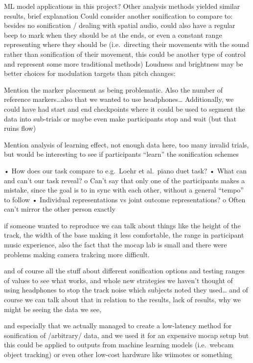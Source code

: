 \documentclass[10pt,a4paper,onecolumn]{article}
\begin{document}
ML model applications in this project?
Other analysis methods yielded similar results, brief explanation
Could consider another sonification to compare to: besides no sonification / dealing with spatial audio, could also have a regular beep to mark when they should be at the ends, or even a constant range representing where they should be (i.e.~directing their movements with the sound rather than sonification of their movement, this could be another type of control and represent some more traditional methods)
Loudness and brightness may be better choices for modulation targets than pitch changes: \autocite{mcdermottMusicalIntervalsRelative2010}

Mention the marker placement as being problematic. Also the number of reference markers\ldots also that we wanted to use headphones\ldots{}
Additionally, we could have had start and end checkpoints where it could be used to segment the data into sub-trials or maybe even make participants stop and wait (but that ruins flow)

Mention analysis of learning effect, not enough data here, too many invalid trials, but would be interesting to see if participants ``learn'' the sonification schemes

• How does our task compare to e.g.~Loehr et al.~piano duet task?
• What can and can't our task reveal?
o Can't say that only one of the participants makes a mistake, since the goal is to in sync with each other, without a general ``tempo'' to follow
• Individual representations vs joint outcome representations?
o Often can't mirror the other person exactly

if someone wanted to reproduce we can talk about things like the height of the track, the width of the base making it less comfortable, the range in participant music experience, also the fact that the mocap lab is small and there were problems making camera trakcing more difficult.

and of course all the stuff about different sonification options and testing ranges of values to see what works, and whole new strategies we haven't thought of using headphones to stop the track noise which subjects noted they used\ldots{}
and of course we can talk about that in relation to the results, lack of results, why we might be seeing the data we see,

and especially that we actually managed to create a low-latency method for sonification of /arbitrary/ data, and we used it for an expensive mocap setup but this could be applied to outputs from machine learning models (i.e.~webcam object tracking) or even other low-cost hardware like wiimotes or something
\end{document}

